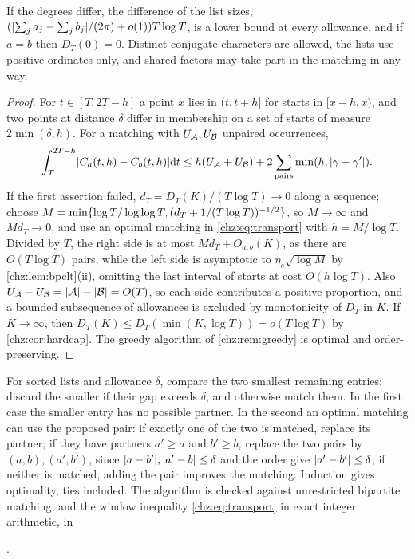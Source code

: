 If the degrees differ, the difference of the list sizes, $(\lvert\sum_ja_j-\sum_jb_j\rvert/(2\pi)+o(1))T\log T$, is a lower
bound at every allowance, and if $a=b$ then $D_T(0)=0$. Distinct conjugate characters are allowed, the lists use
positive ordinates only, and shared factors may take part in the matching in any way.

\begin{proof}
For $t\in[T,2T-h]$ a point $x$ lies in $(t,t+h]$ for starts in $[x-h,x)$, and two points at distance $\delta$ differ in
membership on a set of starts of measure $2\min(\delta,h)$. For a matching with $U_{\mathcal{A}},U_{\mathcal{B}}$ unpaired occurrences,
\begin{equation}\label{chz:eq:transport}
 \int_T^{2T-h}\lvert C_a(t,h)-C_b(t,h)\rvert\mathrm{d} t\le h(U_{\mathcal{A}}+U_{\mathcal{B}})+2\sum_{\text{pairs}}\min(h,\lvert\gamma-\gamma'\rvert).
\end{equation}
If the first assertion failed, $d_T=D_T(K)/(T\log T)\to0$ along a sequence; choose
$M=\min\{\log T/\log\log T,(d_T+1/(T\log T))^{-1/2}\}$, so $M\to\infty$ and $Md_T\to0$, and use an optimal matching
in \eqref{chz:eq:transport} with $h=M/\log T$. Divided by $T$, the right side is at most $Md_T+O_{a,b}(K)$, as there are
$O(T\log T)$ pairs, while the left side is asymptotic to $\eta_c\sqrt{\log M}$ by \cref{chz:lem:bpclt}(ii), omitting the
last interval of starts at cost $O(h\log T)$. Also $U_{\mathcal{A}}-U_{\mathcal{B}}=\lvert\mathcal{A}\rvert-\lvert\mathcal{B}\rvert=O(T)$, so each side contributes a
positive proportion, and a bounded subsequence of allowances is excluded by monotonicity of $D_T$ in $K$. If
$K\to\infty$, then $D_T(K)\le D_T(\min(K,\log T))=o(T\log T)$ by \cref{chz:cor:hardcap}. The greedy algorithm of
\cref{chz:rem:greedy} is optimal and order-preserving.
\end{proof}

\begin{remark}\label{chz:rem:greedy}
For sorted lists and allowance $\delta$, compare the two smallest remaining entries: discard the smaller if their gap
exceeds $\delta$, and otherwise match them. In the first case the smaller entry has no possible partner. In the
second an optimal matching can use the proposed pair: if exactly one of the two is matched, replace its partner;
if they have partners $a'\ge a$ and $b'\ge b$, replace the two pairs by $(a,b),(a',b')$, since $\lvert a-b'\rvert,\lvert a'-b\rvert\le\delta$
and the order give $\lvert a'-b'\rvert\le\delta$; if neither is matched, adding the pair improves the matching. Induction gives
optimality, ties included. The algorithm is checked against unrestricted bipartite matching, and the window
inequality \eqref{chz:eq:transport} in exact integer arithmetic, in
\begin{center}{\footnotesize{}}.\end{center}
\end{remark}

